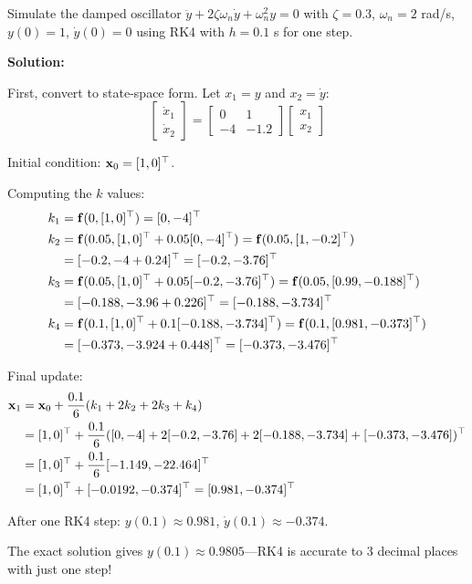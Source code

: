 \begin{examplebox}[title=Example 11.8: RK4 for a Second-Order System]
Simulate the damped oscillator $\ddot{y} + 2\zeta\omega_n\dot{y} + \omega_n^2 y = 0$ with $\zeta = 0.3$, $\omega_n = 2$ rad/s, $y(0) = 1$, $\dot{y}(0) = 0$ using RK4 with $h = 0.1$ s for one step.

\textbf{Solution:}

First, convert to state-space form. Let $x_1 = y$ and $x_2 = \dot{y}$:
\begin{equation*}
\begin{bmatrix} \dot{x}_1 \\ \dot{x}_2 \end{bmatrix} = \begin{bmatrix} 0 & 1 \\ -4 & -1.2 \end{bmatrix} \begin{bmatrix} x_1 \\ x_2 \end{bmatrix}
\end{equation*}

Initial condition: $\mathbf{x}_0 = [1, 0]^\top$.

Computing the $k$ values:
\begin{align*}
k_1 &= \mathbf{f}(0, [1, 0]^\top) = [0, -4]^\top \\
k_2 &= \mathbf{f}(0.05, [1, 0]^\top + 0.05[0, -4]^\top) = \mathbf{f}(0.05, [1, -0.2]^\top) \\
    &= [-0.2, -4 + 0.24]^\top = [-0.2, -3.76]^\top \\
k_3 &= \mathbf{f}(0.05, [1, 0]^\top + 0.05[-0.2, -3.76]^\top) = \mathbf{f}(0.05, [0.99, -0.188]^\top) \\
    &= [-0.188, -3.96 + 0.226]^\top = [-0.188, -3.734]^\top \\
k_4 &= \mathbf{f}(0.1, [1, 0]^\top + 0.1[-0.188, -3.734]^\top) = \mathbf{f}(0.1, [0.981, -0.373]^\top) \\
    &= [-0.373, -3.924 + 0.448]^\top = [-0.373, -3.476]^\top
\end{align*}

Final update:
\begin{align*}
\mathbf{x}_1 &= \mathbf{x}_0 + \frac{0.1}{6}(k_1 + 2k_2 + 2k_3 + k_4) \\
&= [1, 0]^\top + \frac{0.1}{6}([0, -4] + 2[-0.2, -3.76] + 2[-0.188, -3.734] + [-0.373, -3.476])^\top \\
&= [1, 0]^\top + \frac{0.1}{6}[-1.149, -22.464]^\top \\
&= [1, 0]^\top + [-0.0192, -0.374]^\top = [0.981, -0.374]^\top
\end{align*}

After one RK4 step: $y(0.1) \approx 0.981$, $\dot{y}(0.1) \approx -0.374$.

The exact solution gives $y(0.1) \approx 0.9805$---RK4 is accurate to 3 decimal places with just one step!
\end{examplebox}

